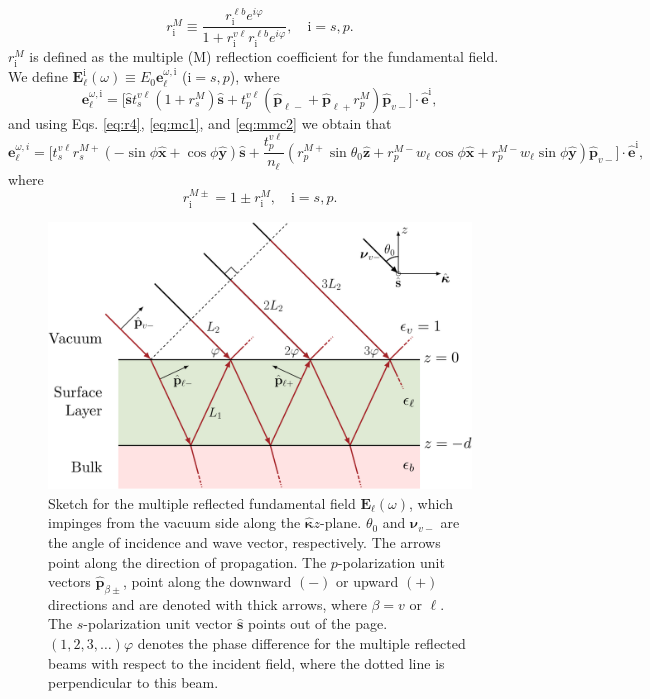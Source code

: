 \documentclass[aps,pra,10pt,amsmath,notitlepage,letterpaper]{revtex4-1}
\begin{document}
\begin{equation}\label{mvrm}
r^{M}_{\mathrm{i}} \equiv
\frac{r^{\ell b}_{\mathrm{i}}e^{i\varphi}}{1+r^{v\ell}_{\mathrm{i}}
r^{\ell b}_{\mathrm{i}}e^{i\varphi}}, \quad \mathrm{i}=s,p.
\end{equation}
$r^{M}_{\mathrm{i}}$ is defined as the multiple (M) reflection coefficient for
the fundamental field. We define $\mathbf{E}^{\mathrm{i}}_{\ell}(\omega)\equiv
E_{0}\mathbf{e}^{\omega,\mathrm{i}}_{\ell}$ ($\mathrm{i}=s,p$), where
\begin{equation}\label{eq:mcvew2}
\mathbf{e}^{\omega,\mathrm{i}}_\ell 
= \Big[\hat{\mathbf{s}} t^{v\ell}_s(1+r^M_s)\hat{\mathbf{s}} 
+ t^{v\ell}_p\left(\hat{\mathbf{p}}_{\ell-}+\hat{\mathbf{p}}_{\ell+}r^{M}_p 
\right)\hat{\mathbf{p}}_{v-}
\Big]\cdot\hat{\mathbf{e}}^{\mathrm{i}},
\end{equation}
and using Eqs. \eqref{eq:r4}, \eqref{eq:mc1}, and \eqref{eq:mmc2} we obtain that
\begin{equation}\label{eq:vec1wcomplete}
\mathbf{e}^{\omega,i}_{\ell}
=
\Bigg[
t^{v\ell}_{s} r^{M+}_{s}
\left(- \sin\phi\hat{\mathbf{x}} + \cos\phi\hat{\mathbf{y}}\right)
\hat{\mathbf{s}}
+
\frac{t^{v\ell}_{p}}{n_{\ell}}
\left( 
  r^{M+}_{p}\sin\theta_{0}\hat{\mathbf{z}}
+ r^{M-}_{p}w_{\ell}\cos\phi\hat{\mathbf{x}}
+ r^{M-}_{p}w_{\ell}\sin\phi\hat{\mathbf{y}}
\right)
\hat{\mathbf{p}}_{v-}
\Bigg]
\cdot \hat{\mathbf{e}}^{\mathrm{i}},
\end{equation} 
where
\begin{equation}\label{eq:mvc}
r^{M\pm}_{\mathrm{i}}=1\pm r^{M}_{\mathrm{i}},\quad \mathrm{i} = s,p.
\end{equation}

\begin{figure}[t]
\centering 
\includegraphics[width=0.65\linewidth]{../../content/figures/diag-3layer_MR_1w}
\caption[Sketch for the multiple reflected, $1\omega$ incoming field.]
{Sketch for the multiple reflected fundamental field
$\mathbf{E}_{\ell}(\omega)$, which impinges from the vacuum side along the
$\hat{\boldsymbol{\kappa}}z$-plane. $\theta_{0}$ and $\boldsymbol{\nu}_{v-}$ are
the angle of incidence and wave vector, respectively. The arrows point along the
direction of propagation. The $p$-polarization unit vectors
$\hat{\mathbf{p}}_{\beta\pm}$, point along the downward $(-)$ or upward $(+)$
directions and are denoted with thick arrows, where $\beta = v$ or $\ell$. The
$s$-polarization unit vector $\hat{\mathbf{s}}$ points out of the page.
$(1,2,3,\ldots)\varphi$ denotes the phase difference for the multiple reflected
beams with respect to the incident field, where the dotted line is perpendicular
to this beam.}
\label{fig:MR3layer1w}
\end{figure}
 
\end{document}
